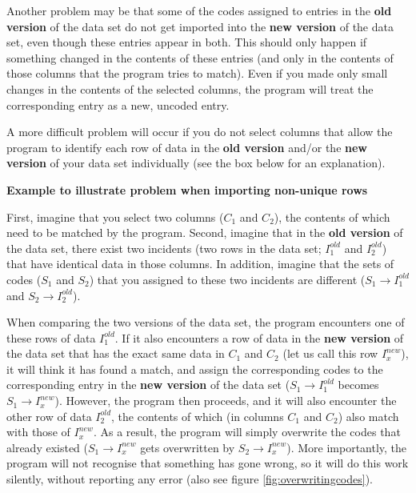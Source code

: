 \documentclass{memoir}
\begin{document}
Another problem may be that some of the codes assigned to entries in the \textbf{old version} of the data set do not get imported into the \textbf{new version} of the data set, even though these entries appear in both. This should only happen if something changed in the contents of these entries (and only in the contents of those columns that the program tries to match). Even if you made only small changes in the contents of the selected columns, the program will treat the corresponding entry as a new, uncoded entry. 

A more difficult problem will occur if you do not select columns that allow the program to identify each row of data in the \textbf{old version} and/or the \textbf{new version} of your data set individually (see the box below for an explanation).

\begin{framed}
  \textbf{Example to illustrate problem when importing non-unique rows}

  First, imagine that you select two columns (\(C_1\) and \(C_2\)), the contents of which need to be matched by the program. Second, imagine that in the \textbf{old version} of the data set, there exist two incidents (two rows in the data set; \(I^{old}_1\) and \(I^{old}_2\)) that have identical data in those columns. In addition, imagine that the sets of codes (\(S_1\) and \(S_2\)) that you assigned to these two incidents are different (\(S_1 \rightarrow I^{old}_1\) and \(S_2 \rightarrow I^{old}_2\)).

  When comparing the two versions of the data set, the program encounters one of these rows of data \(I^{old}_1\). If it also encounters a row of data in the \textbf{new version} of the data set that has the exact same data in \(C_1\) and \(C_2\) (let us call this row \(I^{new}_x\)), it will think it has found a match, and assign the corresponding codes to the corresponding entry in the \textbf{new version} of the data set (\(S_1 \rightarrow I^{old}_1\) becomes \(S_1 \rightarrow I^{new}_x\)). However, the program then proceeds, and it will also encounter the other row of data \(I^{old}_2\), the contents of which (in columns \(C_1\) and \(C_2\)) also match with those of \(I^{new}_x\). As a result, the program will simply overwrite the codes that already existed (\(S_1 \rightarrow I^{new}_x\) gets overwritten by \(S_2 \rightarrow I^{new}_x\)). More importantly, the program will not recognise that something has gone wrong, so it will do this work silently, without reporting any error (also see figure \ref{fig:overwritingcodes}).
\end{framed}
\end{document}
